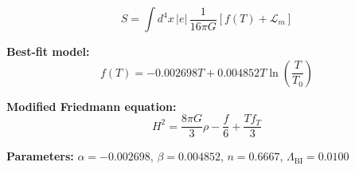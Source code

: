 
\begin{equation}
  S = \int d^4x \, |e| \, \frac{1}{16\pi G} \left[ f(T) + \mathcal{L}_m \right]
\end{equation}

\textbf{Best-fit model:}
\begin{equation}
  f(T) = -0.002698 T + 0.004852 T \ln\!\left(\frac{T}{T_0}\right)
\end{equation}

\textbf{Modified Friedmann equation:}
\begin{equation}
  H^2 = \frac{8\pi G}{3} \rho - \frac{f}{6} + \frac{T f_T}{3}
\end{equation}

\textbf{Parameters:}
$\alpha = -0.002698$, \quad
$\beta = 0.004852$, \quad
$n = 0.6667$, \quad
$\Lambda_{\text{BI}} = 0.0100$
